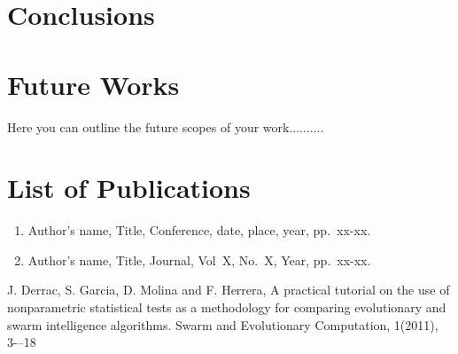 \documentclass[11pt, a4paper]{report}
\begin{document}
\newpage

\chapter{Conclusions}

\newpage

\chapter{Future Works}
Here you can outline the future scopes of your work..........
\newpage

\chapter*{List of Publications}
\begin{enumerate}
\item Author's name, Title, Conference, date, place, year, pp.~xx-xx.
\item Author's name, Title, Journal, Vol~X, No.~X, Year, pp.~xx-xx.
\end{enumerate}
\newpage
\begin{thebibliography}{00}
J. Derrac, S. Garcia, D. Molina and  F. Herrera, A practical tutorial on the use of nonparametric statistical tests as a methodology for comparing evolutionary and swarm intelligence algorithms. Swarm and Evolutionary Computation, 1(2011), 3-–18
\end{thebibliography}
\end{document}
